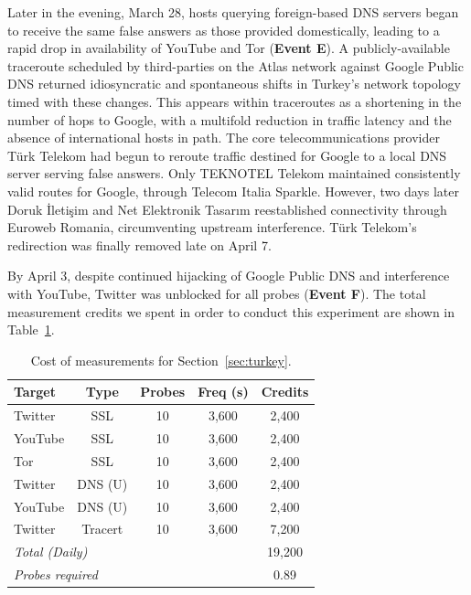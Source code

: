 Later in the evening, March 28, hosts querying foreign-based DNS servers
began to receive the same false answers as those provided domestically,
leading to a rapid drop in availability of YouTube and Tor
(\textbf{Event E}). A publicly-available traceroute scheduled by
third-parties on the Atlas network against Google Public DNS returned
idiosyncratic and spontaneous shifts in Turkey's network topology timed
with these changes. This appears within traceroutes as a shortening in
the number of hops to Google, with a multifold reduction in traffic
latency and the absence of international hosts in path. The core
telecommunications provider T\"{u}rk Telekom had begun to reroute
traffic destined for Google to a local DNS server serving false answers.
Only TEKNOTEL Telekom maintained consistently valid routes for Google,
through Telecom Italia Sparkle. However, two days later Doruk
\.{I}leti\c{s}im and Net Elektronik Tasar{\i}m reestablished
connectivity through Euroweb Romania, circumventing upstream
interference. T\"{u}rk Telekom's redirection was finally removed late on
April 7.

By April 3, despite continued hijacking of Google Public DNS and
interference with YouTube, Twitter was unblocked for all probes
(\textbf{Event F}).  The total measurement credits we spent in order to conduct
this experiment are shown in Table~\ref{table:tr-costs}.

\begin{table}
    \begin{tabular}{l c c c c}
        \textbf{Target} & \textbf{Type}  & \textbf{Probes}  & \textbf{Freq (s)}  & \textbf{Credits}\\
        \hline
		 Twitter & SSL & 10 & 3,600 & 2,400 \\
		 YouTube & SSL & 10 & 3,600 & 2,400 \\
		 Tor & SSL & 10 & 3,600 & 2,400 \\
		 Twitter & DNS (U) & 10 & 3,600 & 2,400 \\
		 YouTube & DNS (U) & 10 & 3,600 & 2,400 \\
		 Twitter & Tracert & 10 & 3,600 & 7,200 \\
        \hline
        \multicolumn{4}{l}{\textit{Total (Daily)}}  & 19,200\\
        \multicolumn{4}{l}{\textit{Probes required}} & 0.89\\
        \hline        
    \end{tabular}
    \caption{Cost of measurements for Section~\ref{sec:turkey}.}
    \label{table:tr-costs}
\end{table}

